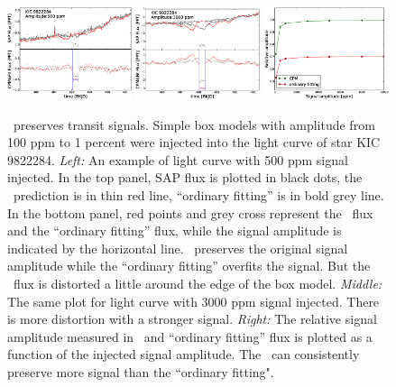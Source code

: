 \begin{figure}[p]
\begin{center}
\includegraphics[width=0.325\textwidth]{figures/cpm/f4a}
\includegraphics[width=0.325\textwidth]{figures/cpm/f4b}
\includegraphics[width=0.325\textwidth]{figures/cpm/f4c}
\end{center}
\caption{
  \label{distortion} 
  \name\ preserves transit signals.
  Simple box models with amplitude from 100 ppm to 1 percent were injected into the light curve of star KIC 9822284. 
  \emph{Left:} An example of light curve with 500 ppm signal injected. In the top panel, SAP flux is plotted in black dots, the \name\ prediction is in thin red line, ``ordinary fitting'' is in bold grey line.
  In the bottom panel, red points and grey cross represent the \name\ flux and the ``ordinary fitting'' flux, while the signal amplitude is indicated by the horizontal line. 
  \name\ preserves the original signal amplitude while the ``ordinary fitting'' overfits the signal. 
  But the \name\ flux is distorted a little around the edge of the box model.
  \emph{Middle:} The same plot for light curve with 3000 ppm signal injected. There is more distortion with a stronger signal.
  \emph{Right:} The relative signal amplitude measured in \name\ and ``ordinary fitting'' flux is plotted as a function of the injected signal amplitude. The \name\ can consistently preserve more signal than the ``ordinary fitting".}
\end{figure}


